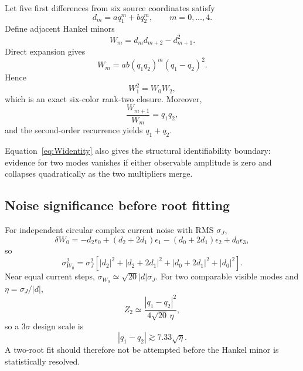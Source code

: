 \documentclass[11pt]{article}
\begin{document}
Let five first differences from six source coordinates satisfy
\begin{equation}
d_m=a q_1^m+b q_2^m,
\qquad m=0,\ldots,4.
\label{eq:twomode}
\end{equation}
Define adjacent Hankel minors
\begin{equation}
W_m=d_md_{m+2}-d_{m+1}^2.
\end{equation}
Direct expansion gives
\begin{equation}
\boxed{W_m=ab(q_1q_2)^m(q_1-q_2)^2.}
\label{eq:Widentity}
\end{equation}
Hence
\begin{equation}
\boxed{W_1^2=W_0W_2,}
\label{eq:rank2closure}
\end{equation}
which is an exact six-color rank-two closure. Moreover,
\begin{equation}
\frac{W_{m+1}}{W_m}=q_1q_2,
\end{equation}
and the second-order recurrence yields $q_1+q_2$.

Equation~\eqref{eq:Widentity} also gives the structural identifiability boundary: evidence for two modes vanishes if either observable amplitude is zero and collapses quadratically as the two multipliers merge.

\subsection{Noise significance before root fitting}

For independent circular complex current noise with RMS $\sigma_J$,
\begin{equation}
\delta W_0
=-d_2\epsilon_0+(d_2+2d_1)\epsilon_1
-(d_0+2d_1)\epsilon_2+d_0\epsilon_3,
\end{equation}
so
\begin{equation}
\boxed{
\sigma_{W_0}^2=\sigma_J^2\left[
|d_2|^2+|d_2+2d_1|^2+|d_0+2d_1|^2+|d_0|^2
\right].}
\label{eq:Wnoise}
\end{equation}
Near equal current steps, $\sigma_{W_0}\simeq\sqrt{20}|d|\sigma_J$. For two comparable visible modes and $\eta=\sigma_J/|d|$,
\begin{equation}
Z_2\simeq\frac{|q_1-q_2|^2}{4\sqrt{20}\,\eta},
\end{equation}
so a $3\sigma$ design scale is
\begin{equation}
\boxed{|q_1-q_2|\gtrsim7.33\sqrt{\eta}.}
\label{eq:twores}
\end{equation}
A two-root fit should therefore not be attempted before the Hankel minor is statistically resolved.
\end{document}
